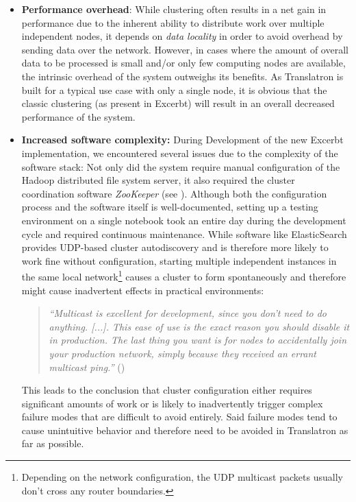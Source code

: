 \documentclass[a4paper, 12pt, twoside, reqn]{report}
\numberwithin{figure}{chapter}
\newtheorem[L]{boxedDefinition}{Definition}
\newtheorem[L]{boxedExample}{Example}
\newcommand{\itquote}[1]{\textit{{``}#1{''}}}
\begin{document}
\begin{itemize}
 \item \textbf{Performance overhead}: While clustering often results in a net gain in performance due to the inherent ability to distribute work over multiple independent nodes, it depends on \textit{data locality} in order to avoid overhead by sending data over the network. However, in cases where the amount of overall data to be processed is small and/or only few computing nodes are available, the intrinsic overhead of the system outweighs its benefits. As Translatron is built for a typical use case with only a single node, it is obvious that the classic clustering (as present in Excerbt) will result in an overall decreased performance of the system.
 
 \item \textbf{Increased software complexity:} During Development of the new Excerbt implementation, we encountered several issues due to the complexity of the software stack: Not only did the system require manual configuration of the Hadoop distributed file system server, it also required the cluster coordination software \textit{ZooKeeper} (see \cite{hunt2010zookeeper}). Although both the configuration process and the software itself is well-documented, setting up a testing environment on a single notebook took an entire day during the development cycle and required continuous maintenance. While software like ElasticSearch provides UDP-based cluster autodiscovery and is therefore more likely to work fine without configuration, starting multiple independent instances in the same local network\footnote{Depending on the network configuration, the UDP multicast packets usually don't cross any router boundaries.} causes a cluster to form spontaneously and therefore might cause inadvertent effects in practical environments:
 
 \begin{quote}
  \itquote{Multicast is excellent for development, since you don’t need to do anything. [...]. This ease of use is the exact reason you should disable it in production. The last thing you want is for nodes to accidentally join your production network, simply because they received an errant multicast ping.} (\cite{elasticsearch-config-changes})
 \end{quote}
 
 This leads to the conclusion that cluster configuration either requires significant amounts of work or is likely to inadvertently trigger complex failure modes that are difficult to avoid entirely. Said failure modes tend to cause unintuitive behavior and therefore need to be avoided in Translatron as far as possible.
 

\end{itemize}
\end{document}
